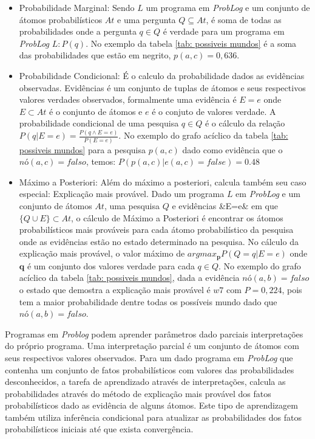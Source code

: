\documentclass[
	12pt,				%
    oneside,			%
	a4paper,			%
	english,			%
	french,				%
	spanish,			%
	brazil,				%
	]{abntex2}
\begin{document}
\begin{itemize}
    \item Probabilidade Marginal: Sendo $L$ um programa em \textit{ProbLog} e um conjunto de átomos probabilísticos $At$ e uma pergunta $Q \subseteq At$, é soma de todas as probabilidades onde a pergunta $q \in Q$ é verdade para um programa em \textit{ProbLog} $L: P(q)$. No exemplo da tabela \ref{tab: possiveis mundos} é a soma das probabilidades que estão em negrito, $p(a, c)=0,636$.
    
    \item Probabilidade Condicional: É o calculo da probabilidade dados as evidências observadas. Evidências é um conjunto de tuplas de átomos e seus respectivos valores verdades observados, formalmente uma evidência é $E=e$ onde $E \subset At$ é o conjunto de átomos e $e$ é o conjuto de valores verdade. A probabilidade condicional de uma pesquisa $q \in Q$ é o cálculo da relação \(P(q|E=e)=\frac{P(q\wedge E=e)}{P(E=e)}\). No exemplo do grafo acíclico da tabela \ref{tab: possiveis mundos} para a pesquisa $p(a,c)$ dado como evidência que o $nó(a,c)=falso$, temos: $P(p(a, c)|e(a, c) = false) =0.48$ 
    
    \item Máximo a Posteriori: Além do máximo a posteriori, calcula também seu caso especial: Explicação mais provável. Dado um programa $L$ em \textit{ProbLog} e um conjunto de átomos $At$, uma pesquisa $Q$ e evidências &E=e& em que $\{Q \cup E\}\subset At$, o cálculo de Máximo a Posteriori é encontrar os átomos probabilísticos mais prováveis para cada átomo probabilístico da pesquisa onde as evidências estão no estado determinado na pesquisa. No cálculo da explicação mais provável, o valor máximo de $argmax_\textbf{p}P(Q=q|E=e)$ onde $\textbf{q}$ é um conjunto dos valores verdade para cada $q\in Q$. No exemplo do grafo acíclico da tabela \ref{tab: possiveis mundos}, dada a evidência $nó(a,b)= falso$ o estado que demostra a explicação mais provável é $w7$ com $P=0,224$, pois tem a maior probabilidade dentre todas os possíveis mundo dado que $nó(a,b)= falso$.
    
\end{itemize} 

Programas em \textit{Problog} podem aprender parâmetros dado parciais interpretações do próprio programa. Uma interpretação parcial é um conjunto de átomos com seus respectivos valores observados. Para um dado programa em \textit{ProbLog} que contenha um conjunto de fatos probabilísticos com valores das probabilidades desconhecidos, a tarefa de aprendizado através de interpretações, calcula as probabilidades através do método de explicação mais provável dos fatos probabilísticos dado as evidência de alguns átomos. Este tipo de aprendizagem também utiliza inferência condicional para atualizar as probabilidades dos fatos probabilísticos iniciais até que exista convergência.
\end{document}
